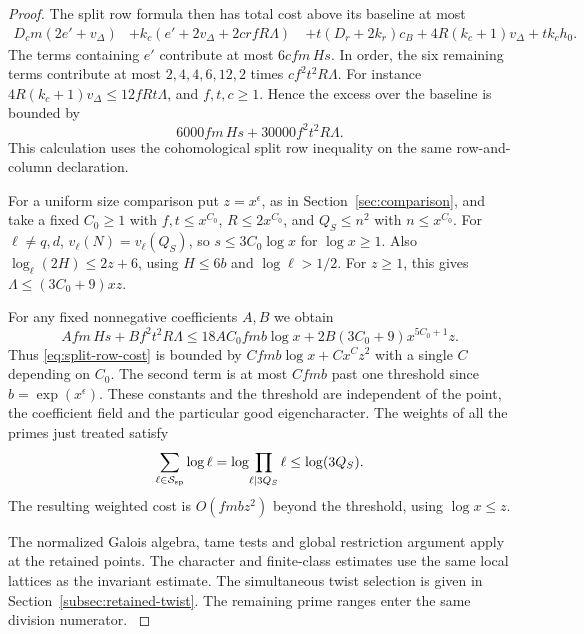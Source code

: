 \begin{proof}
The split row formula then has total cost above its
baseline at most
\begin{align*}
 D_c m(2e'+v_\Delta)
 &+k_c(e'+2v_\Delta+2crfR\Lambda)\
 &+t(D_r+2k_r)c_B+4R(k_c+1)v_\Delta+tk_ch_0 .
\end{align*}
The terms containing \(e'\) contribute at most \(6 c f m\,H s\).
In order, the six remaining terms contribute at most
\(2,4,4,6,12,2\) times \(cf^2t^2R\Lambda\).
For instance \(4R(k_c+1)v_\Delta\le12fRt\Lambda\),
and \(f,t,c\ge1\). Hence the excess over the baseline is
bounded by
\begin{equation}\label{eq:split-row-cost}
             6000 f m\,H s+30000 f^2t^2R\Lambda .
\end{equation}
This calculation uses the cohomological split row
inequality on the same row-and-column declaration.

For a uniform size comparison put \(z=x^\epsilon\), as in
Section~\ref{sec:comparison}, and take a fixed \(C_0\ge1\)
with \(f,t\le x^{C_0}\), \(R\le2x^{C_0}\),
and \(Q_S\le n^2\) with \(n\le x^{C_0}\).
For \(\ell\ne q,d\), \(v_\ell(N)=v_\ell(Q_S)\), so
\(s\le3C_0\log x\) for \(\log x\ge1\).
Also \(\log_\ell(2H)\le2z+6\), using \(H\le6b\)
and \(\log\ell>1/2\).
For \(z\ge1\), this gives \(\Lambda\le(3C_0+9)xz\).

For any fixed nonnegative coefficients \(A,B\) we obtain
\[
 A f m\,H s+B f^2t^2R\Lambda
 \le18AC_0 fmb\log x+
             2B(3C_0+9)x^{5C_0+1}z .
\]
Thus \eqref{eq:split-row-cost} is bounded by
\(C fmb\log x+Cx^Cz^2\) with a single \(C\) depending on
\(C_0\). The second term is at most \(C fmb\) past one
threshold since \(b=\exp(x^\epsilon)\). These constants
and the threshold are independent of the point, the
coefficient field and the particular good eigencharacter.
The weights of all the primes just treated satisfy
\[
    \sum_{\ell\in\mathcal S_{\rm sp}}\log\ell
    =\log\!\prod_{\ell\mid 3Q_S}\ell\le\log(3Q_S).
\]
The resulting weighted cost is \(O(fmbz^2)\) beyond the
threshold, using \(\log x\le z\).

 The normalized Galois algebra, tame tests and
global restriction argument apply at the retained points.
The character and finite-class estimates use the same local
lattices as the invariant estimate.
The simultaneous twist selection is given in
Section~\ref{subsec:retained-twist}.
The remaining prime ranges enter the same division numerator.
\label{cor:small-prime-lengths-4}
\end{proof}

